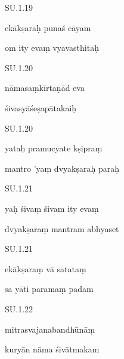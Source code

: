 \documentclass{article}
\begin{document}

    
	
	    
		SU.1.19 
    
	    
		ekākṣaraḥ punaś cāyam 
    
	    
		om ity evaṃ vyavasthitaḥ 
    

    
	
	    
		SU.1.20 
    
	    
		nāmasaṃkīrtaṇād eva 
    
	    
		śivasyāśeṣapātakaiḥ 
    

    
	
	    
		SU.1.20 
    
	    
		yataḥ pramucyate kṣipraṃ 
    
	    
		mantro 'yaṃ dvyakṣaraḥ paraḥ 
    

    
	
	    
		SU.1.21 
    
	    
		yaḥ śivaṃ śivam ity evaṃ 
    
	    
		dvyakṣaraṃ mantram abhyaset 
    

    
	
	    
		SU.1.21 
    
	    
		ekākṣaraṃ vā satataṃ 
    
	    
		sa yāti paramaṃ padam 
    

    
	
	    
		SU.1.22 
    
	    
		mitrasvajanabandhūnāṃ 
    
	    
		kuryān nāma śivātmakam 
    

    
	
\end{document}
